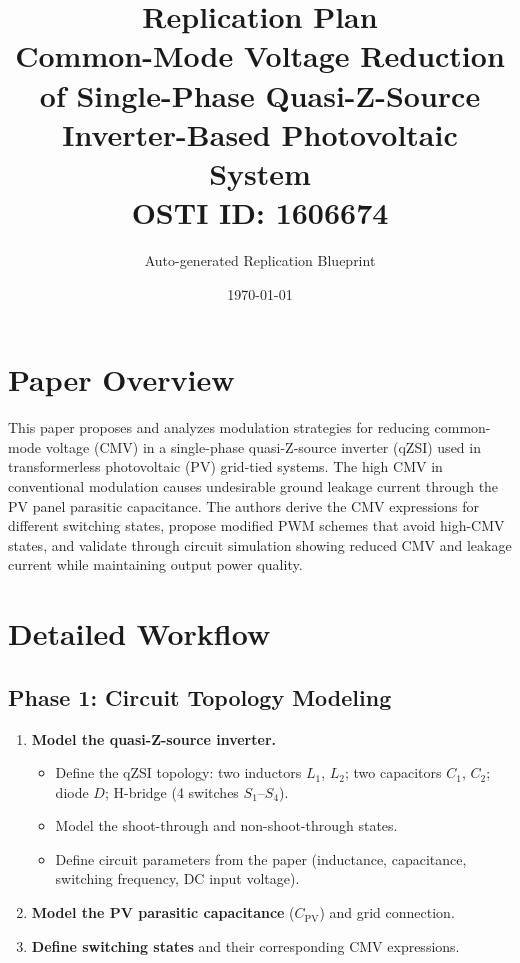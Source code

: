 \documentclass[11pt,a4paper]{article}
\title{\textbf{Replication Plan}\\[0.5em]
\large Common-Mode Voltage Reduction of Single-Phase Quasi-Z-Source Inverter-Based Photovoltaic System\\[0.3em]
\normalsize OSTI ID: 1606674}
\author{Auto-generated Replication Blueprint}
\date{\today}
\begin{document}
\maketitle
\tableofcontents
\newpage

\section{Paper Overview}
This paper proposes and analyzes modulation strategies for reducing common-mode voltage (CMV) in a single-phase quasi-Z-source inverter (qZSI) used in transformerless photovoltaic (PV) grid-tied systems. The high CMV in conventional modulation causes undesirable ground leakage current through the PV panel parasitic capacitance. The authors derive the CMV expressions for different switching states, propose modified PWM schemes that avoid high-CMV states, and validate through circuit simulation showing reduced CMV and leakage current while maintaining output power quality.

\section{Detailed Workflow}

\subsection{Phase 1: Circuit Topology Modeling}
\begin{enumerate}[label=\textbf{1.\arabic*}]
  \item \textbf{Model the quasi-Z-source inverter.}
    \begin{itemize}
      \item Define the qZSI topology: two inductors $L_1$, $L_2$; two capacitors $C_1$, $C_2$; diode $D$; H-bridge (4 switches $S_1$--$S_4$).
      \item Model the shoot-through and non-shoot-through states.
      \item Define circuit parameters from the paper (inductance, capacitance, switching frequency, DC input voltage).
    \end{itemize}
  \item \textbf{Model the PV parasitic capacitance} ($C_{\text{PV}}$) and grid connection.
  \item \textbf{Define switching states} and their corresponding CMV expressions.
\end{enumerate}
\end{document}
